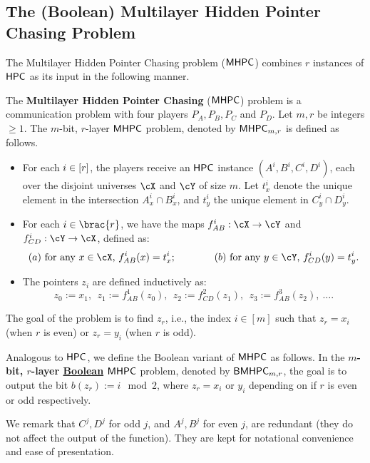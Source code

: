 \documentclass[11pt,letterpaper]{article}
\renewcommand{\geq}{\geqslant}
\theoremstyle{definition}
\newcommand{\bmhpc}{\ensuremath{\textnormal{\textsf{BMHPC}}}\xspace}
\newcommand{\hpc}{\ensuremath{\textnormal{\textsf{HPC}}}\xspace}
\newcommand{\mhpc}{\ensuremath{\textnormal{\textsf{MHPC}}}\xspace}
\newcommand{\bracket}[1]{\mleft[#1\mright]}
\begin{document}
\subsection{The (Boolean) Multilayer Hidden Pointer Chasing Problem}

The Multilayer Hidden Pointer Chasing problem ($\mhpc$) combines
$r$ instances of $\hpc$ as its input in the following manner.


\begin{definition}
  The \textbf{Multilayer Hidden Pointer Chasing} ($\mhpc$) problem is a
  communication problem with four players $P_A, P_B, P_C$ and $P_D$. Let $m,r$ be integers $\geq 1$. The $m$-bit, $r$-layer \mhpc problem, denoted by $\mhpc_{m,r}$ is defined as follows.
  \begin{itemize}
    \item For each $i \in \bracket{r}$, the players receive an $\hpc$ instance
      $(A^i, B^i, C^i, D^i)$, each over the disjoint universes
      $\cX$ and $\cY$ of size $m$.
      Let $t^i_x$ denote the unique element in the intersection
      $A^i_x \cap B^i_x$, and $t^i_y$ the unique element in $C^i_y \cap D^i_y$.
    \item For each $i \in \brac{r}$, we have the maps $f^i_{AB} : \cX \to \cY$
      and $f^i_{CD} : \cY \to \cX$, defined as:
      \[
        (a) ~ \textnormal{for any $x\in \cX$, $f^i_{AB}(x) = t^i_x$;}
        \qquad \qquad
        (b) ~ \textnormal{for any $y\in \cY$, $f^i_{CD}(y) = t^i_y$}.
      \]
    \item
      The pointers $z_i$ are defined inductively as:
      \[
        z_0 := x_1, ~~z_1 := f^1_{AB}(z_0),~~ z_2 := f^2_{CD}(z_1),
        ~~z_3 := f^3_{AB}(z_2),~\ldots.
      \]
  \end{itemize}

  The goal of the problem is to find $z_r$, i.e., the index $i \in [m]$ such that $z_r = x_i$ (when $r$ is even) or $z_r = y_i$ (when $r$ is odd). 

Analogous to \hpc, we define the Boolean variant of $\mhpc$ as follows. In the \textnormal{\textbf{$m$-bit, $r$-layer \underline{Boolean} \mhpc}} problem, denoted by $\bmhpc_{m,r}$, the goal is to output the bit $b(z_r):=i \mod 2$, where $z_r = x_i$ or $y_i$ depending on if $r$ is even or odd respectively. 
\end{definition}

We remark that $C^j, D^j$ for odd $j$, and $A^j, B^j$ for even $j$, are redundant (they do not affect the output of the function). They are kept for notational convenience and ease of presentation. 
\end{document}
